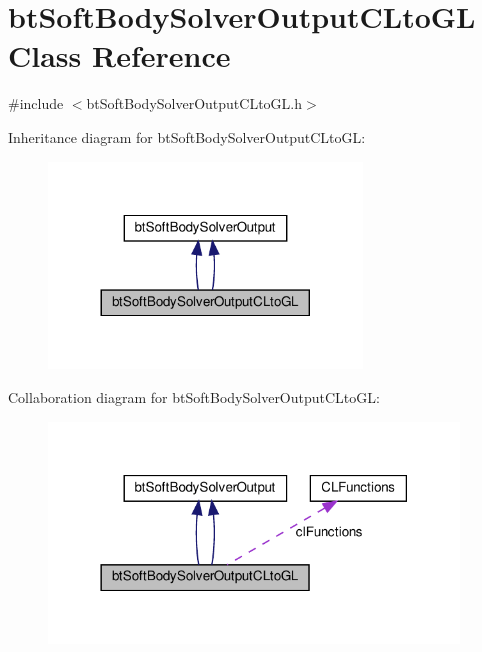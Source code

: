 \hypertarget{classbtSoftBodySolverOutputCLtoGL}{}\section{bt\+Soft\+Body\+Solver\+Output\+C\+Lto\+GL Class Reference}
\label{classbtSoftBodySolverOutputCLtoGL}


{\ttfamily \#include $<$bt\+Soft\+Body\+Solver\+Output\+C\+Lto\+G\+L.\+h$>$}



Inheritance diagram for bt\+Soft\+Body\+Solver\+Output\+C\+Lto\+GL\+:
\nopagebreak
\begin{figure}[H]
\begin{center}
\leavevmode
\includegraphics[width=236pt]{classbtSoftBodySolverOutputCLtoGL__inherit__graph}
\end{center}
\end{figure}


Collaboration diagram for bt\+Soft\+Body\+Solver\+Output\+C\+Lto\+GL\+:
\nopagebreak
\begin{figure}[H]
\begin{center}
\leavevmode
\includegraphics[width=309pt]{classbtSoftBodySolverOutputCLtoGL__coll__graph}
\end{center}
\end{figure}
